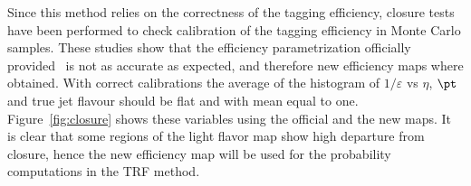 Since this method relies on the correctness of the tagging efficiency,  closure tests have been performed to check
calibration of the tagging efficiency in Monte Carlo samples. These studies show that the efficiency parametrization
officially provided~\cite{topcommon2013}  is not as accurate as expected, and therefore new efficiency maps where
obtained. With correct calibrations the average of the histogram of $1/\varepsilon$ vs $\eta$, $\pt$ and true jet flavour 
should be flat and with mean equal to one. Figure~\ref{fig:closure} shows these variables using the official and the new maps.
It is clear that some regions of the light flavor map show high departure from closure, hence the
new efficiency map will be used for the probability computations in the TRF method.

